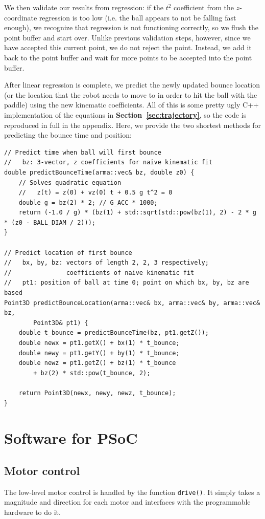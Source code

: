 \documentclass[letterpaper, 11pt]{article}
\newcommand*{\secref}[1]{\textbf{Section~\ref{#1}}}
\begin{document}
We then validate our results from regression: if the $t^2$ coefficient from the $z$-coordinate regression is too low (i.e. the ball appears to not be falling fast enough), we recognize that regression is not functioning correctly, so we flush the point buffer and start over. Unlike previous validation steps, however, since we have accepted this current point, we do not reject the point. Instead, we add it back to the point buffer and wait for more points to be accepted into the point buffer.

After linear regression is complete, we predict the newly updated bounce location (or the location that the robot needs to move to in order to hit the ball with the paddle) using the new kinematic coefficients. All of this is some pretty ugly C++ implementation of the equations in \secref{sec:trajectory}, so the code is reproduced in full in the appendix. Here, we provide the two shortest methods for predicting the bounce time and position:
\begin{verbatim}
// Predict time when ball will first bounce
//   bz: 3-vector, z coefficients for naive kinematic fit
double predictBounceTime(arma::vec& bz, double z0) {
    // Solves quadratic equation
    //   z(t) = z(0) + vz(0) t + 0.5 g t^2 = 0
    double g = bz(2) * 2; // G_ACC * 1000;
    return (-1.0 / g) * (bz(1) + std::sqrt(std::pow(bz(1), 2) - 2 * g * (z0 - BALL_DIAM / 2)));
}

// Predict location of first bounce
//   bx, by, bz: vectors of length 2, 2, 3 respectively;
//               coefficients of naive kinematic fit
//   pt1: position of ball at time 0; point on which bx, by, bz are based
Point3D predictBounceLocation(arma::vec& bx, arma::vec& by, arma::vec& bz,
        Point3D& pt1) {
    double t_bounce = predictBounceTime(bz, pt1.getZ());
    double newx = pt1.getX() + bx(1) * t_bounce;
    double newy = pt1.getY() + by(1) * t_bounce;
    double newz = pt1.getZ() + bz(1) * t_bounce
        + bz(2) * std::pow(t_bounce, 2);

    return Point3D(newx, newy, newz, t_bounce);
}
\end{verbatim}


\section{Software for PSoC}

\subsection{Motor control}
The low-level motor control is handled by the function \verb|drive()|. It simply takes a magnitude and direction for each motor and interfaces with the programmable hardware to do it.
\end{document}
